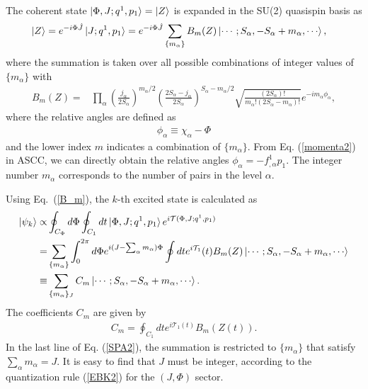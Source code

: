 \documentclass[11pt]{book} %
\begin{document}
The coherent state $\ket{\Phi,J;q^1,p_1}=\ket{Z}$ is
expanded in the SU(2) quasispin basis as
\begin{align}
\ket{Z} &= e^{-i\Phi \hat{J}} \ket{J;q^1,p_1}
 = e^{-i\Phi \hat{J}}\sum_{\{m_\alpha\}} B_m(Z) \ket{\cdots;S_\alpha,-S_\alpha+m_\alpha,\cdots},
\label{coherent2}
\end{align}
where the summation is taken over all possible combinations
of integer values of $\{ m_\alpha\}$ with
\begin{align}
B_m(Z) 
  =& \prod_\alpha \left(\frac{j_\alpha}{2S_\alpha}\right)^{m_\alpha/2}\left(\frac{2S_\alpha-j_\alpha}{2S_\alpha}\right)^{S_\alpha-m_\alpha/2}
 \sqrt{\frac{(2S_\alpha)!}{m_\alpha!(2S_\alpha-m_\alpha)!}}
e^{-i m_\alpha\phi_\alpha}  ,
	\label{B_m}
\end{align}
where the relative angles are defined as
\begin{align}
  \phi_\alpha\equiv\chi_\alpha-\Phi
  \label{phi_multi}
\end{align}
 and the lower index $m$ indicates a combination of $\{ m_\alpha \}$. From Eq. (\ref{momenta2}) in ASCC, we can directly obtain the relative angles $\phi_\alpha = -f^1_{,\alpha}p_1$.
The integer number $m_\alpha$ corresponds to the number of pairs
in the level $\alpha$.
%

Using Eq.~(\ref{B_m}),
the $k$-th excited state is calculated as
\begin{align}
\ket{\psi_k} \propto& \oint_{C_\Phi} d\Phi \oint_{C_1} dt
\ket{\Phi,J;q^1,p_1} e^{i\mathcal{T}(\Phi,J;q^1,p_1)}
 \nonumber \\
	=& \sum_{\{m_\alpha\}}
	\int_0^{2\pi} d\Phi e^{i(J-\sum_\alpha m_\alpha)\Phi} \oint dt e^{i\mathcal{T}_1}(t) B_m (Z) \ket{\cdots;S_\alpha,-S_\alpha+m_\alpha,\cdots} \nonumber \\
 \equiv& \sum_{\{m_\alpha\}_J} C_m \ket{\cdots;S_\alpha,-S_\alpha+m_\alpha,\cdots}.
 \label{SPA2}
\end{align}
The coefficients $C_m$ are given by
\begin{align}
C_m = \oint_{C_1} dt e^{i\mathcal{T}_1(t)} B_m(Z(t)).
  \label{coef}
\end{align}
In the last line of Eq. (\ref{SPA2}), the summation is restricted to
$\{m_\alpha\}$ that satisfy $\sum_\alpha m_\alpha=J$.
It is easy to find that $J$ must be integer,
according to the quantization rule (\ref{EBK2}) for the $(J,\Phi)$ sector.
\end{document}
